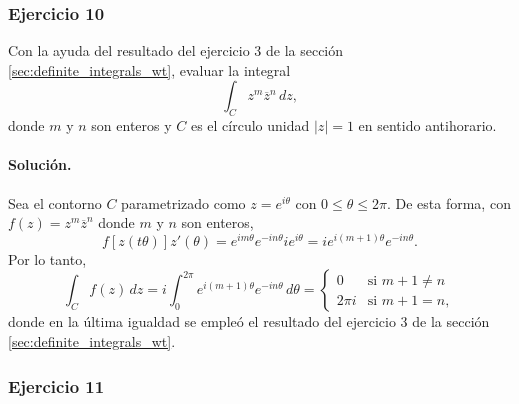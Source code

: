 \documentclass[a4paper]{report}
\begin{document}
\subsubsection{Ejercicio 10}

Con la ayuda del resultado del ejercicio 3 de la sección \ref{sec:definite_integrals_wt}, evaluar la integral 
\[
 \int_Cz^m\overline{z}^n\,dz,
\]
donde \(m\) y \(n\) son enteros y \(C\) es el círculo unidad \(|z|=1\) en sentido antihorario.

\paragraph{Solución.} Sea el contorno \(C\) parametrizado como \(z=e^{i\theta}\) con \(0\leq\theta\leq2\pi\). De esta forma, con \(f(z)=z^m\overline{z}^n\) donde \(m\) y \(n\) son enteros,
\[
 f[z(t\theta)]z'(\theta)=e^{im\theta}e^{-in\theta}ie^{i\theta}=ie^{i(m+1)\theta}e^{-in\theta}.
\]
Por lo tanto,
\[
 \int_Cf(z)\,dz=i\int_0^{2\pi}e^{i(m+1)\theta}e^{-in\theta}\,d\theta=
 \left\{ 
 \begin{array}{ll}
  0 & \textrm{si }m+1\neq n\\
  2\pi i & \textrm{si }m+1=n,
 \end{array}
 \right.
\]
donde en la última igualdad se empleó el resultado del ejercicio 3 de la sección \ref{sec:definite_integrals_wt}.

\subsubsection{Ejercicio 11}
\end{document}
